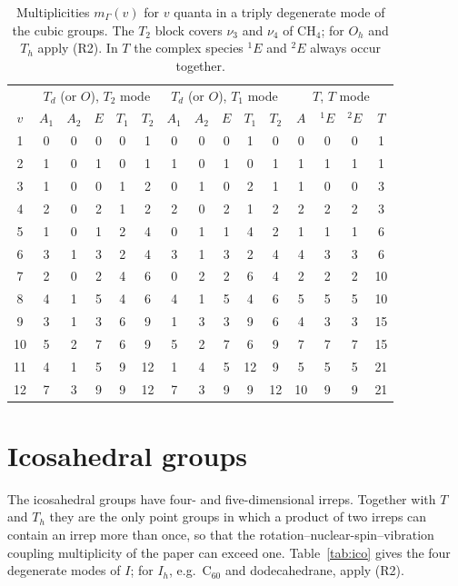 \documentclass[11pt]{article}
\begin{document}
\begin{table}[H]
\centering\small
\setlength{\tabcolsep}{3.5pt}
\begin{tabular}{c|ccccc|ccccc|cccc}
\hline
 & \multicolumn{5}{c|}{$T_d$ (or $O$), $T_2$ mode} & \multicolumn{5}{c|}{$T_d$ (or $O$), $T_1$ mode} & \multicolumn{4}{c}{$T$, $T$ mode}\\
$v$ & $A_{1}$ & $A_{2}$ & $E$ & $T_{1}$ & $T_{2}$ & $A_{1}$ & $A_{2}$ & $E$ & $T_{1}$ & $T_{2}$ & $A$ & ${}^1E$ & ${}^2E$ & $T$\\
\hline
1 & 0 & 0 & 0 & 0 & 1 & 0 & 0 & 0 & 1 & 0 & 0 & 0 & 0 & 1\\
2 & 1 & 0 & 1 & 0 & 1 & 1 & 0 & 1 & 0 & 1 & 1 & 1 & 1 & 1\\
3 & 1 & 0 & 0 & 1 & 2 & 0 & 1 & 0 & 2 & 1 & 1 & 0 & 0 & 3\\
4 & 2 & 0 & 2 & 1 & 2 & 2 & 0 & 2 & 1 & 2 & 2 & 2 & 2 & 3\\
5 & 1 & 0 & 1 & 2 & 4 & 0 & 1 & 1 & 4 & 2 & 1 & 1 & 1 & 6\\
6 & 3 & 1 & 3 & 2 & 4 & 3 & 1 & 3 & 2 & 4 & 4 & 3 & 3 & 6\\
7 & 2 & 0 & 2 & 4 & 6 & 0 & 2 & 2 & 6 & 4 & 2 & 2 & 2 & 10\\
8 & 4 & 1 & 5 & 4 & 6 & 4 & 1 & 5 & 4 & 6 & 5 & 5 & 5 & 10\\
9 & 3 & 1 & 3 & 6 & 9 & 1 & 3 & 3 & 9 & 6 & 4 & 3 & 3 & 15\\
10 & 5 & 2 & 7 & 6 & 9 & 5 & 2 & 7 & 6 & 9 & 7 & 7 & 7 & 15\\
11 & 4 & 1 & 5 & 9 & 12 & 1 & 4 & 5 & 12 & 9 & 5 & 5 & 5 & 21\\
12 & 7 & 3 & 9 & 9 & 12 & 7 & 3 & 9 & 9 & 12 & 10 & 9 & 9 & 21\\
\hline
\end{tabular}
\caption{Multiplicities $m_\Gamma(v)$ for $v$ quanta in a triply degenerate mode of the cubic groups. The $T_2$ block covers $\nu_3$ and $\nu_4$ of $\mathrm{CH_4}$; for $O_h$ and $T_h$ apply (R2). In $T$ the complex species ${}^1E$ and ${}^2E$ always occur together.}
\label{tab:cubic}
\end{table}

\section{Icosahedral groups}

The icosahedral groups have four- and five-dimensional irreps. Together with $T$ and $T_h$ they are the only point groups in which a product of two irreps can contain an irrep more than once, so that the rotation--nuclear-spin--vibration coupling multiplicity of the paper can exceed one. Table~\ref{tab:ico} gives the four degenerate modes of $I$; for $I_h$, e.g.\ $\mathrm{C_{60}}$ and dodecahedrane, apply (R2).
\end{document}
